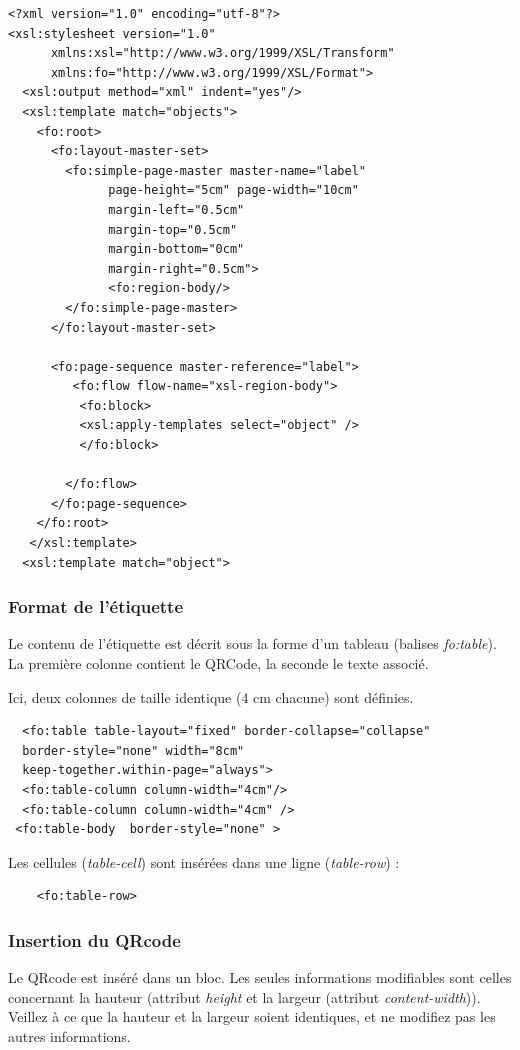 \begin{lstlisting}
<?xml version="1.0" encoding="utf-8"?>
<xsl:stylesheet version="1.0"
      xmlns:xsl="http://www.w3.org/1999/XSL/Transform"
      xmlns:fo="http://www.w3.org/1999/XSL/Format">
  <xsl:output method="xml" indent="yes"/>
  <xsl:template match="objects">
    <fo:root>
      <fo:layout-master-set>
        <fo:simple-page-master master-name="label"
              page-height="5cm" page-width="10cm" 
              margin-left="0.5cm" 
              margin-top="0.5cm" 
              margin-bottom="0cm" 
              margin-right="0.5cm">  
              <fo:region-body/>
        </fo:simple-page-master>
      </fo:layout-master-set>
      
      <fo:page-sequence master-reference="label">
         <fo:flow flow-name="xsl-region-body">        
          <fo:block>
          <xsl:apply-templates select="object" />
          </fo:block>

        </fo:flow>
      </fo:page-sequence>
    </fo:root>
   </xsl:template>
  <xsl:template match="object">
\end{lstlisting}

\subsubsection{Format de l'étiquette}
Le contenu de l'étiquette est décrit sous la forme d'un tableau (balises \textit{fo:table}). La première colonne contient le QRCode, la seconde le texte associé.

Ici, deux colonnes de taille identique (4 cm chacune) sont définies.

\begin{lstlisting}
  <fo:table table-layout="fixed" border-collapse="collapse"  
  border-style="none" width="8cm" 
  keep-together.within-page="always">
  <fo:table-column column-width="4cm"/>
  <fo:table-column column-width="4cm" />
 <fo:table-body  border-style="none" >
\end{lstlisting}

Les cellules (\textit{table-cell}) sont insérées dans une ligne (\textit{table-row}) :

\begin{lstlisting}
 	<fo:table-row>
\end{lstlisting}

\subsubsection{Insertion du QRcode}
Le QRcode est inséré dans un bloc. Les seules informations modifiables sont celles concernant la hauteur (attribut \textit{height} et la largeur (attribut \textit{content-width})). Veillez à ce que la hauteur et la largeur soient identiques, et ne modifiez pas les autres informations.

